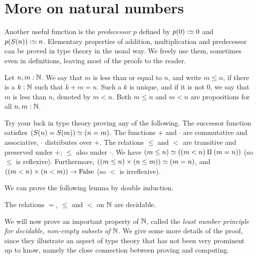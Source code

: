 \section{More on natural numbers}
\label{sec:more-on-N}

Another useful function is the \emph{predecessor} $p$ defined by
$p(0)\defeq 0$ and $p(S(n))\defeq n$.
Elementary properties of addition, multiplication and predecessor
can be proved in type theory in the usual way.
We freely use them, sometimes even in definitions, leaving most of the
proofs to the reader.

\begin{definition}
\label{def:orderonN}
Let $n,m:\mathbb{N}$. We say that $m$ is less than or equal to $n$, and write $m\leq n$,
if there is a $k:\mathbb{N}$ such that $k+m=n$. Such a $k$ is unique, and if it
is not $0$, we say that $m$ is less than $n$, denoted by $m<n$.
Both $m\leq n$ and $m<n$ are propositions for all $n,m:\mathbb{N}$.
\end{definition}

\begin{xca}\label{xca:try-your-luck-N}
Try your luck in type theory proving any of the following.
The successor function satisfies $(S(n)=S(m))\simeq(n=m)$.
The functions $+$ and $\cdot$ are commutative and associative,
$\cdot$ distributes over $+$.
The relations $\leq$ and $<$ are transitive and
preserved under $+$; $\leq$ also under $\cdot$. 
We have $(m\leq n) \simeq ((m<n)\amalg(m=n))$ (so $\leq$ is reflexive).
Furthermore, $((m\leq n)\times (n\leq m)) \simeq (m=n)$,
and $((m<n)\times(n<m))\to\mathrm{False}$ (so $<$ is irreflexive).
\end{xca}

We can prove the following lemma by double induction.

\begin{lemma}\label{lem:dec-eq+order-N}
The relations $=$, $\leq$ and $<$ on $\mathbb{N}$ are decidable.
\end{lemma}

We will now prove an important property of $\mathbb{N}$, called the
\emph{least number principle for decidable, non-empty subsets of} $\mathbb{N}$.
We give some more details of the proof, since they illustrate an aspect
of type theory that has not been very prominent up to know, namely
the close connection between proving and computing.

